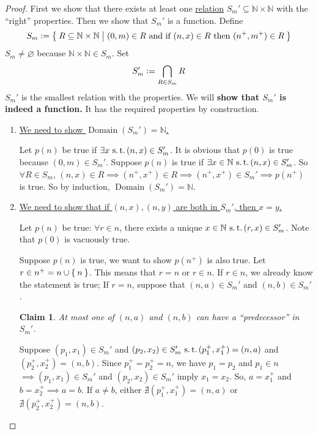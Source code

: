 \documentclass[12pt]{amsart}
\newcommand{\bbN}{\mathbb{N}}
\newcommand{\suchthat}{\operatorname{\thinspace s.t. \thinspace}}
\theoremstyle{plain}
\newtheorem*{claim}{Claim}
\theoremstyle{remark}
\theoremstyle{definition}
\begin{document}
\begin{proof}
	First we show that there exists at least one \ul{relation} $S_m' \subseteq \bbN \times \bbN$ with the ``right'' properties. Then we show that $S_m'$ is a function.
	Define 
	\begin{equation*}
		S_m \vcentcolon = \Set{R \subseteq \bbN \times \bbN | (0, m) \in R \text{ and if } (n,x) \in R \text{ then } (n^+, m^+)\in R}
	\end{equation*}
	$S_m \neq \varnothing$ because $\bbN \times \bbN \in S_m$. Set
	\begin{equation*}
		S_m' \vcentcolon = \bigcap\limits_{R\in S_m}R
	\end{equation*}
	$S_m'$ is the smallest relation with the properties. We will {\bf show that $S_m'$ is indeed a function.} It has the required properties by construction.
	\begin{enumerate}[(1)]
	\item \ul{We need to show  $\operatorname{Domain}(S_m') = \bbN$.}

	\par
	Let $p(n)$ be true if $\exists x \suchthat (n, x)\in S_m'$. It is obvious that $p(0)$ is true because $(0, m) \in S_m'$. 
	Suppose $p(n)$ is true if $\exists x \in \bbN \suchthat (n, x) \in S_m'$. So $\forall R \in S_m$, $(n, x) \in R \implies (n^+, x^+) \in R \implies (n^+, x^+) \in S_m' \implies p(n^+)$ is true. So by induction, $\operatorname{Domain}(S_m') = \bbN$.

	\item \ul{We need to show that if $(n, x), (n, y)$ are both in $S_m'$, then $x = y$.}
	\par
	Let $p(n)$ be true: $\forall r \in n$, there exists a unique  $x \in \bbN \suchthat (r, x) \in S_m'$. Note that $p(0)$ is vacuously true.

	\par
	Suppose $p(n)$ is true, we want to show $p(n^+)$ is also true. Let $r \in n^+ = n \cup \Set{n}$. This means that $r = n $ or $ r \in n$.
	If $r \in n$, we already know the statement is true; If $r = n$, suppose that $(n, a) \in S_m'$ and $(n, b) \in S_m'$.
	\begin{claim}
		At most one of $(n,a)$ and $(n,b)$ can have a ``predecessor'' in $S_m'$. 
	\end{claim}
	Suppose $(p_1, x_1) \in S_m'$ and $(p_2, x_2) \in S_m' \suchthat (p_1^+, x_1^+) = (n, a)$ and $(p_2^+, x_2^+) = (n, b)$. Since $p_1^+ = p_2^+ = n$, we have $p_1 = p_2$ and $p_1 \in n$ 
	$\implies (p_1,x_1) \in S_m'$ and $(p_2, x_2) \in S_m'$ imply $x_1 = x_2$.
	So, $a = x_1^+$ and $b = x_2^+ \implies a = b$. If $a \neq b$, either $\nexists (p_1^+, x_1^+) = (n, a)$ or $\nexists (p_2^+, x_2^+) = (n, b)$.


\end{enumerate}
\end{proof}
\end{document}
